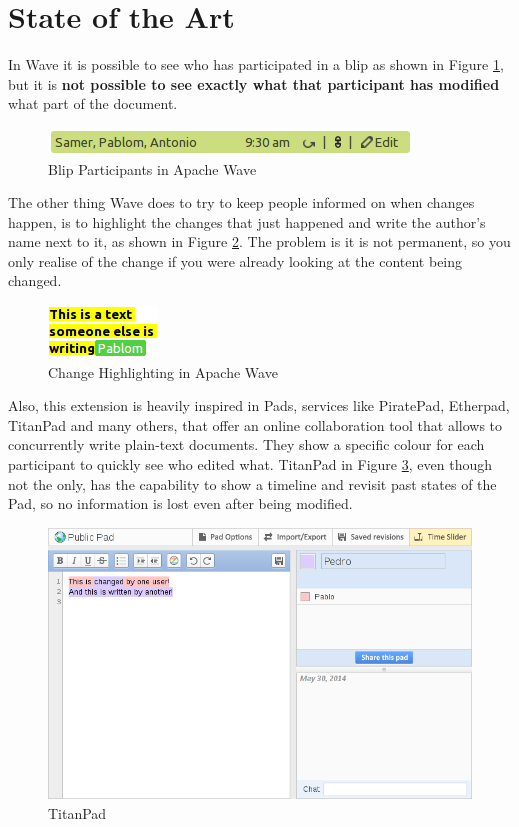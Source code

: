 \section{State of the Art}
\label{subsec:color_soa}
In Wave it is possible to see who has participated in a blip as shown in Figure \ref{fig:participants}, but it is \textbf{not possible to see exactly what that participant has modified} what part of the document.
\begin{figure}[H]
  \center
    \includegraphics[keepaspectratio, scale=0.7]{Media/Captures/Wave/Participants.png}
  \caption{Blip Participants in Apache Wave}
  \label{fig:participants}
\end{figure}
The other thing Wave does to try to keep people informed on when changes happen, is to highlight the changes that just happened and write the author's name next to it, as shown in Figure \ref{fig:participants2}. The problem is it is not permanent, so you only realise of the change if you were already looking at the content being changed.
\begin{figure}[H]
  \center
    \includegraphics[keepaspectratio, scale=0.7]{Media/Captures/Wave/Participants2.png}
  \caption{Change Highlighting in Apache Wave}
  \label{fig:participants2}
\end{figure}
Also, this extension is heavily inspired in Pads, services like PiratePad, Etherpad, TitanPad and many others, that offer an online collaboration tool that allows to concurrently write plain-text documents. They show a specific colour for each participant to quickly see who edited what. TitanPad in Figure \ref{fig:titanpad}, even though not the only, has the capability to show a timeline and revisit past states of the Pad, so no information is lost even after being modified.
\begin{figure}[h]
  \center
    \includegraphics[keepaspectratio, scale=0.4]{Media/Captures/Soa/TitanPad.png}
  \caption{TitanPad}
  \label{fig:titanpad}
\end{figure}

